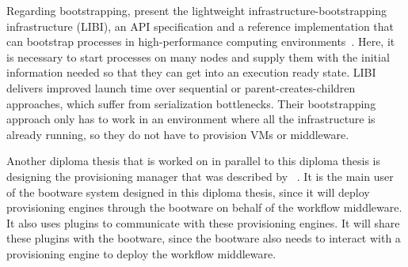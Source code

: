 Regarding bootstrapping, \citeauthor*{libi} present the lightweight infrastructure-bootstrapping infrastructure (LIBI), an API specification and a reference implementation that can bootstrap processes in high-performance computing environments~\autocite{libi}.
Here, it is necessary to start processes on many nodes and supply them with the initial information needed so that they can get into an execution ready state.
LIBI delivers improved launch time over sequential or parent-creates-children approaches, which suffer from serialization bottlenecks.
Their bootstrapping approach only has to work in an environment where all the infrastructure is already running, so they do not have to provision VMs or middleware.

Another diploma thesis that is worked on in parallel to this diploma thesis is designing the provisioning manager that was described by \citeauthor*{provisioning:dynamic}~\autocite{nedim}.
It is the main user of the bootware system designed in this diploma thesis, since it will deploy provisioning engines through the bootware on behalf of the workflow middleware.
It also uses plugins to communicate with these provisioning engines.
It will share these plugins with the bootware, since the bootware also needs to interact with a provisioning engine to deploy the workflow middleware.
